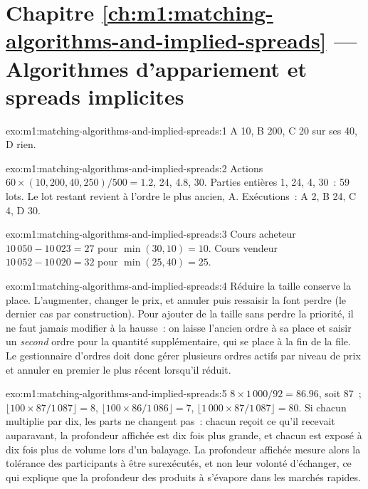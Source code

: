 \section*{Chapitre \ref{ch:m1:matching-algorithms-and-implied-spreads} --- Algorithmes d'appariement et spreads implicites}

\begin{solution}{exo:m1:matching-algorithms-and-implied-spreads:1}
A 10, B 200, C 20 sur ses 40, D rien.
\end{solution}

\begin{solution}{exo:m1:matching-algorithms-and-implied-spreads:2}
Actions $60 \times (10, 200, 40, 250)/500 = 1.2$, 24, 4.8, 30. Parties entières 1, 24, 4,
30~: 59 lots. Le lot restant revient à l'ordre le plus ancien, A. Exécutions~: A 2, B
24, C 4, D 30.
\end{solution}

\begin{solution}{exo:m1:matching-algorithms-and-implied-spreads:3}
Cours acheteur $10\,050 - 10\,023 = 27$ pour $\min(30, 10) = 10$. Cours vendeur $10\,052 - 10\,020 =
32$ pour $\min(25, 40) = 25$.
\end{solution}

\begin{solution}{exo:m1:matching-algorithms-and-implied-spreads:4}
Réduire la taille conserve la place. L'augmenter, changer le prix, et
annuler puis ressaisir la font perdre (le dernier cas par construction). Pour ajouter
de la taille sans perdre la priorité, il ne faut jamais modifier à la hausse~: on laisse l'ancien ordre à sa place
et saisir un \emph{second} ordre pour la quantité supplémentaire, qui
se place à la fin de la file. Le gestionnaire d'ordres doit donc gérer plusieurs
ordres actifs par niveau de prix et annuler en premier le plus récent lorsqu'il réduit.
\end{solution}

\begin{solution}{exo:m1:matching-algorithms-and-implied-spreads:5}
$8 \times 1\,000/92 = 86.96$, soit 87~; $\lfloor 100 \times 87/1\,087\rfloor = 8$,
$\lfloor 100 \times 86/1\,086\rfloor = 7$, $\lfloor 1\,000 \times 87/1\,087\rfloor
= 80$. Si chacun multiplie par dix, les parts ne changent pas~: chacun reçoit
ce qu'il recevait auparavant, la profondeur affichée est dix fois plus grande, et chacun est
exposé à dix fois plus de volume lors d'un balayage. La profondeur affichée mesure alors la
tolérance des participants à être surexécutés, et non leur volonté d'échanger, ce qui
explique que la profondeur des produits à  s'évapore dans les marchés rapides.
\end{solution}

